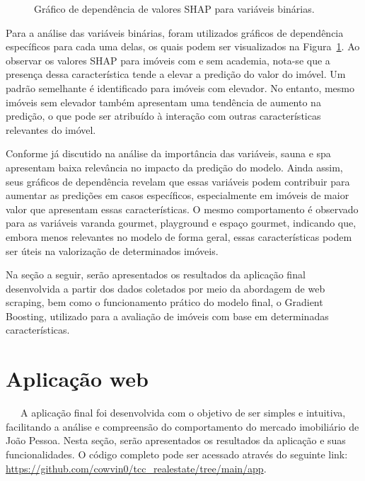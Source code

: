 \documentclass[
  12pt,
  a4paper,
]{scrreprt}
\begin{document}
\begin{figure}
\caption{\label{fig-dependence_plot}Gráfico de dependência de valores
SHAP para variáveis binárias.}

\end{figure}%

\vspace{12pt}

Para a análise das variáveis binárias, foram utilizados gráficos de
dependência específicos para cada uma delas, os quais podem ser
visualizados na Figura~\ref{fig-dependence_plot}. Ao observar os valores
SHAP para imóveis com e sem academia, nota-se que a presença dessa
característica tende a elevar a predição do valor do imóvel. Um padrão
semelhante é identificado para imóveis com elevador. No entanto, mesmo
imóveis sem elevador também apresentam uma tendência de aumento na
predição, o que pode ser atribuído à interação com outras
características relevantes do imóvel.

\vspace{12pt}

Conforme já discutido na análise da importância das variáveis, sauna e
spa apresentam baixa relevância no impacto da predição do modelo. Ainda
assim, seus gráficos de dependência revelam que essas variáveis podem
contribuir para aumentar as predições em casos específicos,
especialmente em imóveis de maior valor que apresentam essas
características. O mesmo comportamento é observado para as variáveis
varanda gourmet, playground e espaço gourmet, indicando que, embora
menos relevantes no modelo de forma geral, essas características podem
ser úteis na valorização de determinados imóveis.

\vspace{12pt}

Na seção a seguir, serão apresentados os resultados da aplicação final
desenvolvida a partir dos dados coletados por meio da abordagem de web
scraping, bem como o funcionamento prático do modelo final, o Gradient
Boosting, utilizado para a avaliação de imóveis com base em determinadas
características.

\section{Aplicação web}\label{aplicauxe7uxe3o-web}

~~~A aplicação final foi desenvolvida com o objetivo de ser simples e
intuitiva, facilitando a análise e compreensão do comportamento do
mercado imobiliário de João Pessoa. Nesta seção, serão apresentados os
resultados da aplicação e suas funcionalidades. O código completo pode
ser acessado através do seguinte link:
\url{https://github.com/cowvin0/tcc_realestate/tree/main/app}.
\end{document}
